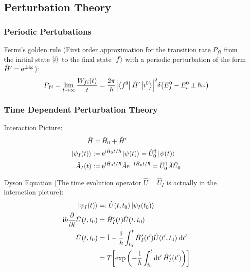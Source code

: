 	\subsection{Perturbation Theory}
		\subsubsection{Periodic Pertubations}
			\noindent
			Fermi's golden rule (First order approximation for the transition rate $P_{fi}$ from the initial state $\Ket{i}$ to the final state $\Ket{f}$ with a periodic perturbation of the form $\hat{H}' = \mathrm{e}^{\pm\mathrm{i}\omega}$):
			\begin{equation}
				P_{fi} = \lim_{t\rightarrow\infty} \frac{W_{fi}(t)}{t} = \frac{2\pi}{\hbar} \abs{\Bra{f^0}\hat{H}'\Ket{i^0}}^2 \delta\qty(E_f^0 - E_i^0 \pm \hbar\omega)
			\end{equation}

		\subsubsection{Time Dependent Perturbation Theory}
			Interaction Picture:
			\begin{equation}
				\begin{aligned}
					\hat{H} =&\, \hat{H}_0 + \hat{H}' \\
					\Ket{\psi_I(t)} :=&\, \mathrm{e}^{\mathrm{i} \hat{H}_0 t / \hbar} \Ket{\psi(t)}
					= \hat{U}_0^\dagger \Ket{\psi(t)} \\
					\Hat{A}_I(t) :=&\, \mathrm{e}^{\mathrm{i} \hat{H}_0 t / \hbar} \hat{A} \mathrm{e}^{-\mathrm{i} \hat{H}_0 t / \hbar}
					= \hat{U}_0^\dagger \hat{A} \hat{U}_0
				\end{aligned}
			\end{equation}

			\noindent
			Dyson Equation (The time evolution operator $\hat{U} = \hat{U}_I$ is actually in the interaction picture):
			\begin{equation}
				\begin{aligned}
					\Ket{\psi_I(t)} &=: \hat{U}(t,t_0) \Ket{\psi_I(t_0)} \\
					\mathrm{i} \hbar \pdv{t} \hat{U}(t,t_0) &= \hat{H}_I'(t) \hat{U}(t,t_0) \\
					\hat{U}(t,t_0) &= \hat{1} - \frac{\mathrm{i}}{\hbar} \int_{t_0}^{t} \hat{H}'_I(t') \hat{U}(t',t_0) \;\dd t' \\
					&= T \qty[\exp\qty(-\frac{\mathrm{i}}{\hbar}\int_{t_0}^{t}\dd t'\,\hat{H}'_I(t'))]
				\end{aligned}
			\end{equation}

